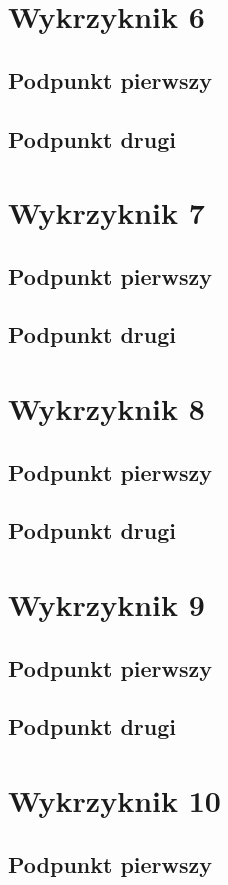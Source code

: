 \documentclass[a4paper,12pt]{article}
\begin{document}
    \section{Wykrzyknik 6}
    	\subsection{Podpunkt pierwszy}
    	\subsection{Podpunkt drugi}
    \section{Wykrzyknik 7}
    	\subsection{Podpunkt pierwszy}
    	\subsection{Podpunkt drugi}
    \section{Wykrzyknik 8}
    	\subsection{Podpunkt pierwszy}
    	\subsection{Podpunkt drugi}
    \section{Wykrzyknik 9}
    	\subsection{Podpunkt pierwszy}
    	\subsection{Podpunkt drugi}
    \section{Wykrzyknik 10}
    	\subsection{Podpunkt pierwszy}
\end{document}
